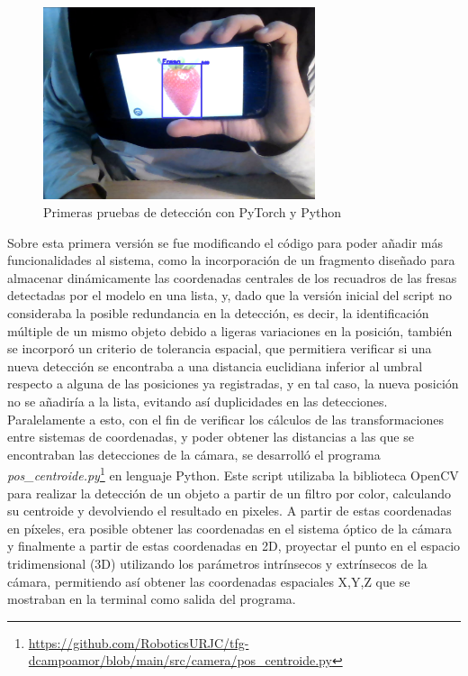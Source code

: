   \begin{figure}[H]
     \centering
     \begin{center}
       \includegraphics[width=80mm]{figs/deteccion_video fresa en foto.png}
     \end{center}
     \caption{Primeras pruebas de detección con PyTorch y Python}
    \label{fig:primerasdetecciones_Python}
  \end{figure}

Sobre esta primera versión se fue modificando el código para poder añadir más funcionalidades al sistema, como la incorporación de un fragmento diseñado para almacenar dinámicamente las coordenadas centrales de los recuadros de las fresas detectadas por el modelo en una lista, y, dado que la versión inicial del script no consideraba la posible redundancia en la detección, es decir, la identificación múltiple de un mismo objeto debido a ligeras variaciones en la posición, también se incorporó un criterio de tolerancia espacial, que permitiera verificar si una nueva detección se encontraba a una distancia euclidiana inferior al umbral respecto a alguna de las posiciones ya registradas, y en tal caso, la nueva posición no se añadiría a la lista, evitando así duplicidades en las detecciones.\\

Paralelamente a esto, con el fin de verificar los cálculos de las transformaciones entre sistemas de coordenadas, y poder obtener las distancias a las que se encontraban las detecciones de la cámara, se desarrolló el programa \textit{pos\_centroide.py}\footnote{\url{https://github.com/RoboticsURJC/tfg-dcampoamor/blob/main/src/camera/pos_centroide.py}} en lenguaje Python. Este script utilizaba la biblioteca OpenCV para realizar la detección de un objeto a partir de un filtro por color, calculando su centroide y devolviendo el resultado en pixeles. A partir de estas coordenadas en píxeles, era posible obtener las coordenadas en el sistema óptico de la cámara y finalmente a partir de estas coordenadas en 2D, proyectar el punto en el espacio tridimensional (3D) utilizando los parámetros intrínsecos y extrínsecos de la cámara, permitiendo así obtener las coordenadas espaciales X,Y,Z que se mostraban en la terminal como salida del programa. \\

